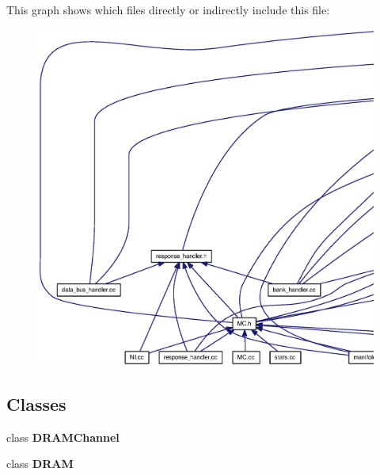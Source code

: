 This graph shows which files directly or indirectly include this file:\nopagebreak
\begin{figure}[H]
\begin{center}
\leavevmode
\includegraphics[width=420pt]{dram_8h__dep__incl}
\end{center}
\end{figure}
\subsection*{Classes}
\begin{CompactItemize}
\item 
class {\bf DRAMChannel}
\item 
class {\bf DRAM}
\end{CompactItemize}

